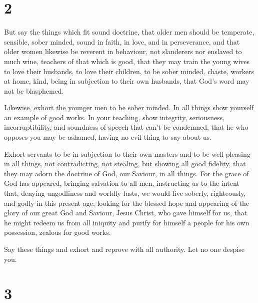\hypertarget{section-1}{%
\section{2}\label{section-1}}

 But say the things which fit sound doctrine,
 that older men should be temperate, sensible, sober
minded, sound in faith, in love, and in perseverance,  and
that older women likewise be reverent in behaviour, not slanderers nor
enslaved to much wine, teachers of that which is good, 
that they may train the young wives to love their husbands, to love
their children,  to be sober minded, chaste, workers at
home, kind, being in subjection to their own husbands, that God's word
may not be blasphemed.

 Likewise, exhort the younger men to be sober minded.
 In all things show yourself an example of good works. In
your teaching, show integrity, seriousness, incorruptibility,
 and soundness of speech that can't be condemned, that he
who opposes you may be ashamed, having no evil thing to say about us.

 Exhort servants to be in subjection to their own masters
and to be well-pleasing in all things, not contradicting,
 not stealing, but showing all good fidelity, that they
may adorn the doctrine of God, our Saviour, in all things.
 For the grace of God has appeared, bringing salvation to
all men,  instructing us to the intent that, denying
ungodliness and worldly lusts, we would live soberly, righteously, and
godly in this present age;  looking for the blessed hope
and appearing of the glory of our great God and Saviour, Jesus Christ,
 who gave himself for us, that he might redeem us from
all iniquity and purify for himself a people for his own possession,
zealous for good works.

 Say these things and exhort and reprove with all
authority. Let no one despise you.

\hypertarget{section-2}{%
\section{3}\label{section-2}}

